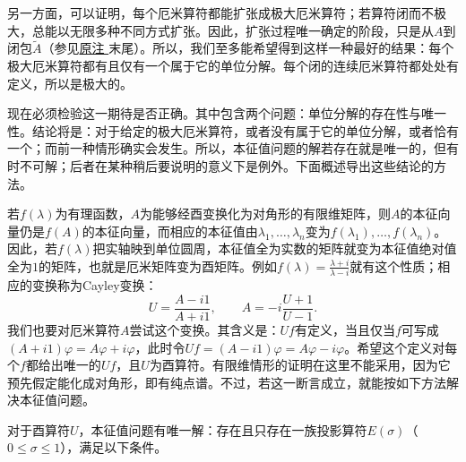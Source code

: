 \documentclass[fontsize=13pt,twoside,openany,headings=normal,parskip=false,bookmarkpackage=false,DIV=calc]{scrbook}
\begin{document}
\hypertarget{origpage-80}{}\label{origpage-80}另一方面，可以证明，每个厄米算符都能扩张成极大厄米算符；若算符闭而不极大，总能以无限多种不同方式扩张。因此，扩张过程唯一确定的阶段，只是从$A$到闭包$\widetilde A$（参见\CJKglue \hyperlink{note-95}{原注 } 末尾）。所以，我们至多能希望得到这样一种最好的结果：每个极大厄米算符都有且仅有一个属于它的单位分解。每个闭的连续厄米算符都处处有定义，所以是极大的。

现在必须检验这一期待是否正确。其中包含两个问题：单位分解的存在性与唯一性。结论将是：对于给定的极大厄米算符，或者没有属于它的单位分解，或者恰有一个；而前一种情形确实会发生。所以，本征值问题的解若存在就是唯一的，但有时不可解；后者在某种稍后要说明的意义下是例外。下面概述导出这些结论的方法。

若$f(\lambda)$为有理函数，$A$为能够经酉变换化为对角形的有限维矩阵，则$A$的本征向量仍是$f(A)$的本征向量，而相应的本征值由$\lambda_1,\allowbreak \ldots,\allowbreak \lambda_n$变为$f(\lambda_1),\allowbreak \ldots,\allowbreak f(\lambda_n)$。因此，若$f(\lambda)$把实轴映到单位圆周，本征值全为实数的矩阵就变为本征值绝对值全为$1$的矩阵，也就是厄米矩阵变为酉矩阵。例如$f(\lambda)=\frac{\lambda+i}{\lambda-i}$就有这个性质；相应的变换称为Cayley变换：
\[
U=\frac{A-i1}{A+i1},\qquad A=-i\frac{U+1}{U-1}.
\]
我们也要对厄米算符$A$尝试这个变换。其含义是：$Uf$有定义，当且仅当$f$可写成$(A+i1)\varphi=A\varphi+i\varphi$，此时令$Uf=(A-i1)\varphi=A\varphi-i\varphi$。希望这个定义对每个$f$都给出唯一的$Uf$，且$U$为酉算符。有限维情形的证明在这里不能采用，因为它预先假定能化成对角形，即有纯点谱。不过，若这一断言成立，就能按如下方法解决本征值问题。

对于酉算符$U$，本征值问题有唯一解：存在且只存在一族投影算符$E(\sigma)$（$0\leq\sigma\leq1$），满足以下条件。
\end{document}
